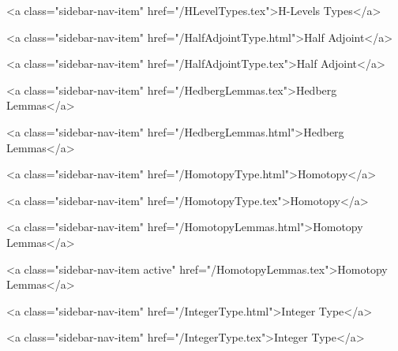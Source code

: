       
        
          <a class="sidebar-nav-item" href="/HLevelTypes.tex">H-Levels Types</a>
        
      
    
      
        
          <a class="sidebar-nav-item" href="/HalfAdjointType.html">Half Adjoint</a>
        
      
    
      
        
          <a class="sidebar-nav-item" href="/HalfAdjointType.tex">Half Adjoint</a>
        
      
    
      
        
          <a class="sidebar-nav-item" href="/HedbergLemmas.tex">Hedberg Lemmas</a>
        
      
    
      
        
          <a class="sidebar-nav-item" href="/HedbergLemmas.html">Hedberg Lemmas</a>
        
      
    
      
        
          <a class="sidebar-nav-item" href="/HomotopyType.html">Homotopy</a>
        
      
    
      
        
          <a class="sidebar-nav-item" href="/HomotopyType.tex">Homotopy</a>
        
      
    
      
        
          <a class="sidebar-nav-item" href="/HomotopyLemmas.html">Homotopy Lemmas</a>
        
      
    
      
        
          <a class="sidebar-nav-item active" href="/HomotopyLemmas.tex">Homotopy Lemmas</a>
        
      
    
      
        
          <a class="sidebar-nav-item" href="/IntegerType.html">Integer Type</a>
        
      
    
      
        
          <a class="sidebar-nav-item" href="/IntegerType.tex">Integer Type</a>
        
      
    
